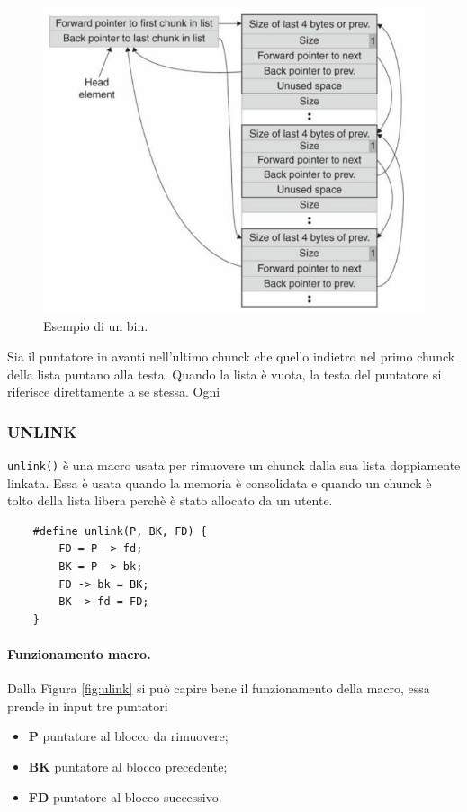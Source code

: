 \begin{figure}[H]
    \centering
    \includegraphics[width=12cm, keepaspectratio]{capitoli/secure_coding/img/cap_4/bin.png}
    \caption{Esempio di un bin.}\label{fig:bin}
\end{figure}
Sia il puntatore in avanti nell'ultimo chunck che quello indietro nel primo chunck della lista puntano alla testa. Quando la lista è vuota, la testa del puntatore si riferisce direttamente a se stessa.  Ogni
\subsubsection{UNLINK}
\verb|unlink()| è una macro usata per rimuovere un chunck dalla sua lista doppiamente linkata. Essa è usata quando la memoria è consolidata e quando un chunck è tolto della lista libera perchè è stato allocato da un utente.
\begin{verbatim}
    #define unlink(P, BK, FD) {
        FD = P -> fd;
        BK = P -> bk;
        FD -> bk = BK;
        BK -> fd = FD;
    }
\end{verbatim}

\paragraph{Funzionamento macro.}
Dalla Figura \ref{fig:ulink} si può capire bene il funzionamento della macro, essa prende in input tre puntatori
\begin{itemize}
    \item \textbf{P} puntatore al blocco da rimuovere;
    \item \textbf{BK} puntatore al blocco precedente;
    \item \textbf{FD} puntatore al blocco successivo.
\end{itemize}


